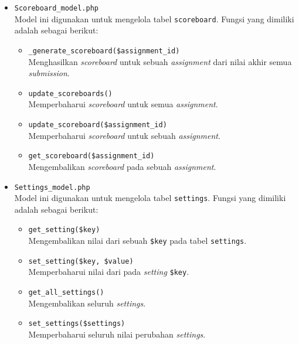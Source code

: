 \begin{itemize}
      \item \verb|Scoreboard_model.php| \\
            Model ini digunakan untuk mengelola tabel \verb|scoreboard|. Fungsi yang dimiliki adalah sebagai berikut:

            \begin{itemize}
                  \item \verb|_generate_scoreboard($assignment_id)| \\
                        Menghasilkan \textit{scoreboard} untuk sebuah \textit{assignment} dari nilai akhir semua \textit{submission}.
                  \item \verb|update_scoreboards()| \\
                        Memperbaharui \textit{scoreboard} untuk semua \textit{assignment}.
                  \item \verb|update_scoreboard($assignment_id)| \\
                        Memperbaharui \textit{scoreboard} untuk sebuah \textit{assignment}.
                  \item \verb|get_scoreboard($assignment_id)| \\
                        Mengembalikan \textit{scoreboard} pada sebuah \textit{assignment}.
            \end{itemize}

      \item \verb|Settings_model.php| \\
            Model ini digunakan untuk mengelola tabel \verb|settings|. Fungsi yang dimiliki adalah sebagai berikut:

            \begin{itemize}
                  \item \verb|get_setting($key)| \\
                        Mengembalikan nilai dari sebuah \verb|$key| pada tabel \verb|settings|.
                  \item \verb|set_setting($key, $value)| \\
                        Memperbaharui nilai dari pada \textit{setting} \verb|$key|.
                  \item \verb|get_all_settings()| \\
                        Mengembalikan seluruh \textit{settings}.
                  \item \verb|set_settings($settings)| \\
                        Memperbaharui seluruh nilai perubahan \textit{settings}.
            \end{itemize}


\end{itemize}
